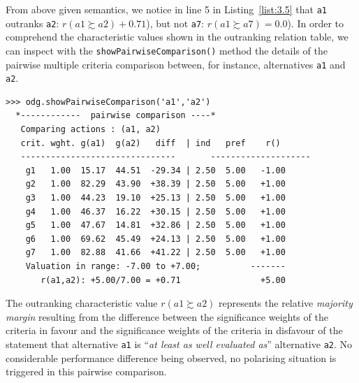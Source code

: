 From above given semantics, we notice in line 5 in Listing~\vref{list:3.5} that \texttt{a1} outranks \texttt{a2}: $r(a1 \succsim a2) + 0.71$), but not \texttt{a7}: $r(a1 \succsim a7) = 0.0$). In order to comprehend the characteristic values shown in the outranking relation table, we can inspect with the \texttt{showPairwiseComparison()} method the details of the pairwise multiple criteria comparison between, for instance, alternatives \texttt{a1} and \texttt{a2}.
\begin{lstlisting}[caption={Inspecting a pairwise multiple criteria comparison},label=list:3.6]
>>> odg.showPairwiseComparison('a1','a2')
  *------------  pairwise comparison ----*
   Comparing actions : (a1, a2)
   crit. wght. g(a1)  g(a2)   diff  | ind   pref    r() 
   -------------------------------  	 --------------------
    g1   1.00  15.17  44.51  -29.34 | 2.50  5.00   -1.00 
    g2   1.00  82.29  43.90  +38.39 | 2.50  5.00   +1.00 
    g3   1.00  44.23  19.10  +25.13 | 2.50  5.00   +1.00 
    g4   1.00  46.37  16.22  +30.15 | 2.50  5.00   +1.00 
    g5   1.00  47.67  14.81  +32.86 | 2.50  5.00   +1.00 
    g6   1.00  69.62  45.49  +24.13 | 2.50  5.00   +1.00 
    g7   1.00  82.88  41.66  +41.22 | 2.50  5.00   +1.00 
    Valuation in range: -7.00 to +7.00;          -------
       r(a1,a2): +5.00/7.00 = +0.71                +5.00
\end{lstlisting}

The outranking characteristic value $r(a1 \succsim a2)$ represents the relative \emph{majority margin} resulting from the difference between the significance weights of the criteria in favour and the significance weights of the criteria in disfavour of the statement that alternative \texttt{a1} is ``\emph{at least as well evaluated as}'' alternative \texttt{a2}. No considerable performance difference being observed, no polarising situation is triggered in this pairwise comparison.

